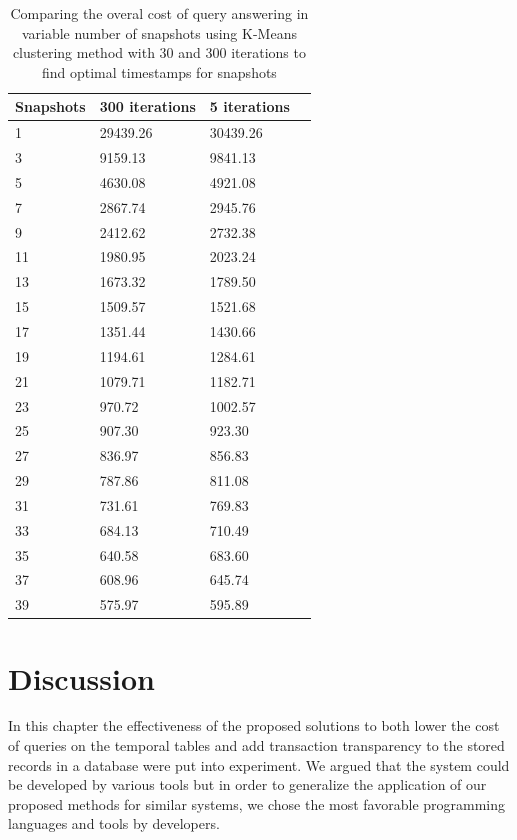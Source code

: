 			\begin {center}
			\begin{table}
				\centering
				\caption{Comparing the overal cost of query answering in variable number of snapshots using K-Means clustering method with 30 and 300 iterations to find optimal timestamps for snapshots}
				\label {table:compare_clustring_iterations}
				\begin{tabular}{p{2cm}p{3cm}p{3cm}p{3cm}}
					\hline
					Snapshots  & 300 iterations  & 5 iterations \\ \hline
					1 & 29439.26 & 30439.26 \\  
					3 & 9159.13  & 9841.13\\
					5 & 4630.08  & 4921.08\\
					7 & 2867.74  & 2945.76\\
					9 & 2412.62  & 2732.38\\
					11 & 1980.95  & 2023.24\\
					13 & 1673.32  & 1789.50\\
					15 & 1509.57  & 1521.68\\
					17 & 1351.44  & 1430.66\\
					19 & 1194.61  & 1284.61\\
					21 & 1079.71  & 1182.71\\
					23 & 970.72  & 1002.57\\
					25 & 907.30  & 923.30\\
					27 & 836.97  & 856.83\\
					29 & 787.86  & 811.08\\
					31 & 731.61  & 769.83\\
					33 & 684.13  & 710.49\\
					35 & 640.58  & 683.60\\
					37 & 608.96  & 645.74\\
					39 & 575.97  & 595.89\\\hline
				\end{tabular}
			\end{table}
			\end{center}

		\section{Discussion}
			In this chapter the effectiveness of the proposed solutions to both lower the cost of queries on the temporal tables and add transaction transparency to the stored records in a database were put into experiment. We argued that the system could be developed by various tools but in order to generalize the application of our proposed methods for similar systems, we chose the most favorable programming languages and tools by developers.

